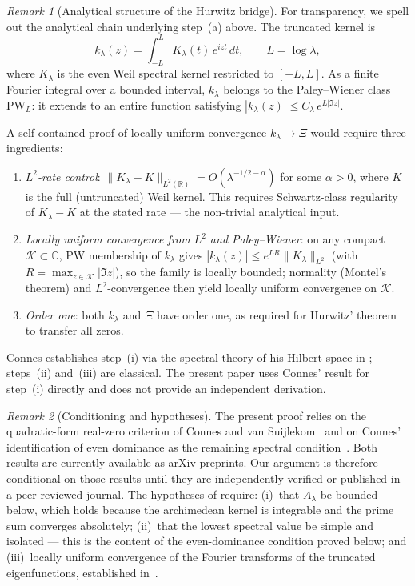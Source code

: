 \documentclass[11pt,a4paper]{article}
\theoremstyle{remark}
\newtheorem{remark}[remark]{Remark}
\theoremstyle{plain}
\begin{document}
\begin{remark}[Analytical structure of the Hurwitz bridge]
\label{rem:hurwitz-analytical}
For transparency, we spell out the analytical chain underlying step~(a) above.
The truncated kernel is
\[
  k_\lambda(z)
  = \int_{-L}^{L} K_\lambda(t)\,e^{izt}\,dt, \qquad L = \log\lambda,
\]
where $K_\lambda$ is the even Weil spectral kernel restricted to $[-L,L]$.
As a finite Fourier integral over a bounded interval, $k_\lambda$ belongs to
the Paley--Wiener class $\mathrm{PW}_L$: it extends to an entire function
satisfying $|k_\lambda(z)|\leq C_\lambda\,e^{L|\Im z|}$.

A self-contained proof of locally uniform convergence $k_\lambda\to\Xi$
would require three ingredients:
\begin{enumerate}[label=(\roman*),leftmargin=*]
  \item \emph{$L^2$-rate control}: $\|K_\lambda - K\|_{L^2(\mathbb{R})}
    = O(\lambda^{-1/2-\alpha})$ for some $\alpha>0$,
    where $K$ is the full (untruncated) Weil kernel.
    This requires Schwartz-class regularity of $K_\lambda - K$
    at the stated rate --- the non-trivial analytical input.
  \item \emph{Locally uniform convergence from $L^2$ and Paley--Wiener}:
    on any compact $\mathcal{K}\subset\mathbb{C}$, PW membership of $k_\lambda$
    gives $|k_\lambda(z)|\leq e^{LR}\|K_\lambda\|_{L^2}$
    (with $R = \max_{z\in\mathcal{K}}|\Im z|$), so the family is
    locally bounded; normality (Montel's theorem) and $L^2$-convergence
    then yield locally uniform convergence on $\mathcal{K}$.
  \item \emph{Order one}: both $k_\lambda$ and $\Xi$ have order one,
    as required for Hurwitz' theorem to transfer all zeros.
\end{enumerate}
Connes establishes step~(i) via the spectral theory of his Hilbert space in
\cite[Fact~6.4 and Sections~6.4--6.6]{Connes2026};
steps~(ii) and~(iii) are classical.
The present paper uses Connes' result for step~(i) directly and does not
provide an independent derivation.
\end{remark}

\begin{remark}[Conditioning and hypotheses]
\label{rem:conditioning}
The present proof relies on the quadratic-form real-zero criterion of
Connes and van Suijlekom~\cite{ConnesvS2025} and on Connes' identification
of even dominance as the remaining spectral condition~\cite{Connes2026}.
Both results are currently available as arXiv preprints. Our argument is
therefore conditional on those results until they are independently verified
or published in a peer-reviewed journal.
The hypotheses of  require: (i)~that $A_\lambda$ be bounded
below, which holds because the archimedean kernel is integrable and the
prime sum converges absolutely; (ii)~that the lowest spectral value be simple
and isolated --- this is the content of the even-dominance condition proved
below; and (iii)~locally uniform convergence of the Fourier transforms of the
truncated eigenfunctions, established in~\cite[Section~4]{Connes2026}.
\end{remark}
\end{document}
